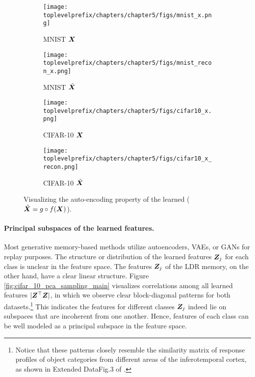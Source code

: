 \documentclass[../../book-main.tex]{subfiles}
\begin{document}
\begin{figure}[t]
    \begin{subfigure}[t]{0.20\textwidth}
        \centering
        \texttt{[image: \\toplevelprefix/chapters/chapter5/figs/mnist\_x.png]}
        \caption{MNIST $\bm{X}$}
    \end{subfigure}
    \hfill
    \begin{subfigure}[t]{0.20\textwidth}
        \centering
        \texttt{[image: \\toplevelprefix/chapters/chapter5/figs/mnist\_recon\_x.png]}
        \caption{MNIST $\hat{\bm{X}}$}
    \end{subfigure}
    \hfill
    \begin{subfigure}[t]{0.20\textwidth}
        \centering
        \texttt{[image: \\toplevelprefix/chapters/chapter5/figs/cifar10\_x.png]}
        \caption{CIFAR-10 $\bm{X}$}
    \end{subfigure}
    \hfill
    \begin{subfigure}[t]{0.20\textwidth}
        \centering
        \texttt{[image: \\toplevelprefix/chapters/chapter5/figs/cifar10\_x\_recon.png]}
        \caption{CIFAR-10 $\hat{\bm{X}}$}
    \end{subfigure}
    \caption{\small Visualizing the auto-encoding property of the learned  ($\hat{\bm{X}} = g\circ f(\bm{X})$). }
        \label{fig:justfy_xhat_equals_x_incremental}
\end{figure}


\paragraph{Principal subspaces of the learned features.}
Most generative memory-based methods utilize autoencoders, VAEs, or GANs for replay purposes. The structure or distribution of the learned features $\bm{Z}_j$ for each class is  unclear in the feature space. The features $\bm{Z}_j$ of the LDR memory, on the other hand, have a clear linear structure. Figure \ref{fig:cifar_10_pca_sampling_main} visualizes correlations among all learned features $|\bm{Z}^\top\bm{Z}|$, in which we observe clear block-diagonal patterns for both datasets.\footnote{Notice that these patterns closely resemble the similarity matrix of response profiles of object categories from different areas of the inferotemporal cortex, as shown in  Extended DataFig.3 of \cite{Bao2020AMO}.} This indicates the features for different classes $\bm{Z}_j$ indeed lie on subspaces that are incoherent from one another. Hence, features of each class can be well modeled as a principal subspace in the feature space. %
\end{document}
